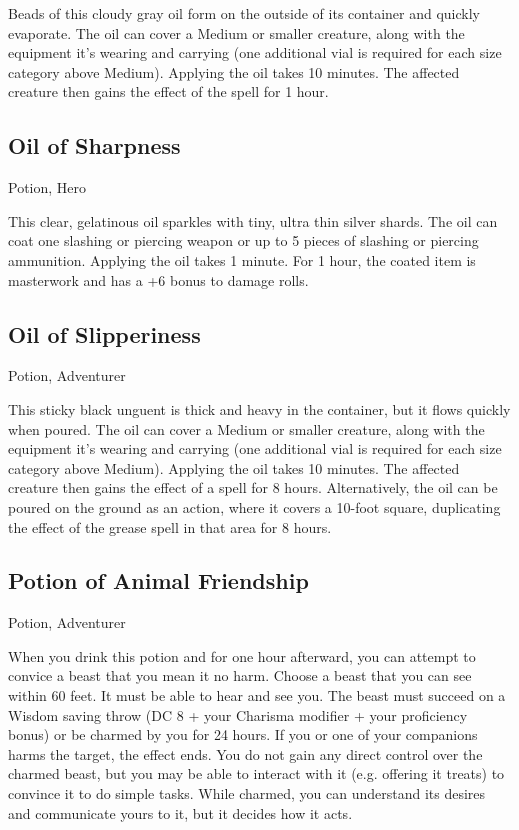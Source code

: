 Beads of this cloudy gray oil form on the outside of its container and quickly evaporate. The oil can cover a Medium or smaller creature, along with the equipment it's wearing and carrying (one additional vial is required for each size category above Medium). Applying the oil takes 10 minutes. The affected creature then gains the effect of the  spell for 1 hour.

\subsection{Oil of Sharpness}
Potion, Hero 

This clear, gelatinous oil sparkles with tiny, ultra thin silver shards. The oil can coat one slashing or piercing weapon or up to 5 pieces of slashing or piercing ammunition. Applying the oil takes 1 minute. For 1 hour, the coated item is masterwork and has a +6 bonus to damage rolls.

\subsection{Oil of Slipperiness}
Potion, Adventurer 

This sticky black unguent is thick and heavy in the container, but it flows quickly when poured. The oil can cover a Medium or smaller creature, along with the equipment it's wearing and carrying (one additional vial is required for each size category above Medium). Applying the oil takes 10 minutes. The affected creature then gains the effect of a  spell for 8 hours.  Alternatively, the oil can be poured on the ground as an action, where it covers a 10-foot square, duplicating the effect of the grease spell in that area for 8 hours.

\subsection{Potion of Animal Friendship}
Potion, Adventurer

When you drink this potion and for one hour afterward, you can attempt to convice a beast that you mean it no harm. Choose a beast that you can see within 60 feet. It must be able to hear and see you. The beast must succeed on a Wisdom saving throw (DC 8 + your Charisma modifier + your proficiency bonus) or be charmed by you for 24 hours. If you or one of your companions harms the target, the effect ends. You do not gain any direct control over the charmed beast, but you may be able to interact with it (e.g. offering it treats) to convince it to do simple tasks. While charmed, you can understand its desires and communicate yours to it, but it decides how it acts.

